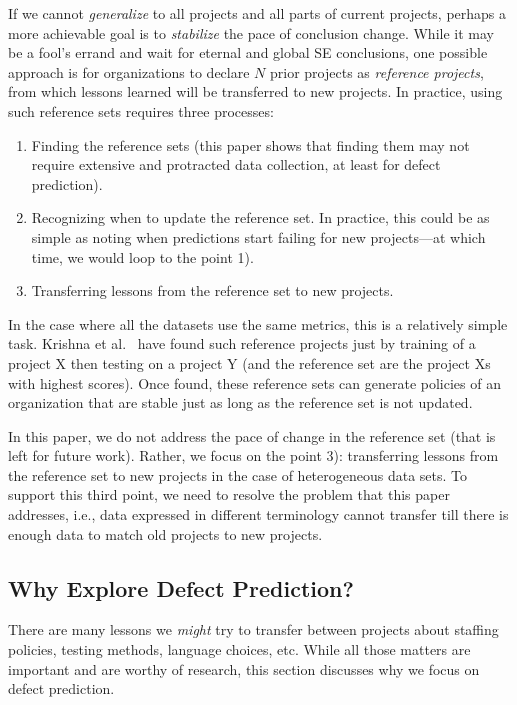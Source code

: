 If we cannot {\em generalize} to all projects and all parts
of current projects, perhaps a more achievable goal is to {\em stabilize} the pace of conclusion change.
While it may be
a fool's errand and wait for eternal and global SE
conclusions, one possible approach is for organizations
to declare $N$ prior projects as {\em reference projects},
from which lessons learned will be transferred to new projects.
In practice, using such reference sets requires three processes:
\begin{enumerate}
\item Finding the reference sets (this paper shows that finding
  them may not require extensive and protracted data collection, at least for defect prediction).
  \item Recognizing when to update the reference set. In practice,
  this could be as simple as noting when predictions start failing for new projects---at which time, we would loop to the point 1).
\item Transferring
  lessons from the reference set to new projects.
\end{enumerate}
In the case where all the datasets use the same metrics, this is a relatively
simple task. Krishna et al.~\cite{krishna16} have found such reference projects just by training of
a project X then testing on a project Y (and the reference set are the project Xs with highest scores).
Once found, these reference sets can generate policies of an organization that are
stable just as long as the reference set is not updated.

In this paper, we do not address the pace of change in the reference set
(that is left for future work).
Rather, we focus on the point 3): transferring lessons from
the reference set to new projects in the case of heterogeneous data sets. To support this third point,
we need to resolve the problem
  that this paper addresses, i.e., data expressed in different terminology
  cannot transfer till there is enough data to match old projects to new projects.




\subsection{Why Explore Defect Prediction?}

There are many lessons we {\em might} try to transfer between projects
about staffing policies, testing methods, language choices, etc. While
all those matters are important and are worthy of research, this section
discusses why we focus on defect prediction.

